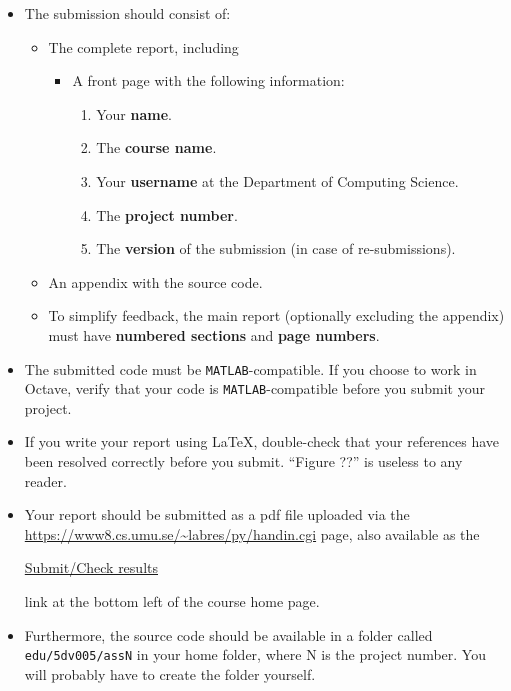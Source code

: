 \documentclass[a4paper,12pt]{article}
\begin{document}
{%
  \begin{itemize}
  \item The submission should consist of:
    \begin{itemize}
    \item The complete report, including
      \begin{itemize}
      \item A front page with the following information:
        \begin{enumerate}
        \item Your {\bf name}.
        \item The {\bf course name}.
        \item Your {\bf username} at the Department of Computing
          Science.
        \item The {\bf project number}.
        \item The {\bf version} of the submission (in case of re-submissions).
        \end{enumerate}
      \end{itemize}
    \item An appendix with the source code.
    \item To simplify feedback, the main report (optionally excluding
      the appendix) must have {\bf numbered sections} and {\bf page
        numbers}.
    \end{itemize}
  \item The submitted code must be {\tt MATLAB}-compatible. If you choose to
    work in Octave, verify that your code is {\tt MATLAB}-compatible before
    you submit your project.
  \item If you write your report using \LaTeX, double-check that your
    references have been resolved correctly before you submit. ``Figure ??'' is useless to any reader.
  \item Your report should be submitted as a pdf file uploaded via
    the\linebreak
    \href{https://www8.cs.umu.se/~labres/py/handin.cgi}{https://www8.cs.umu.se/\textasciitilde{}labres/py/handin.cgi}
    page, also available as the
    \begin{center}
      \href{https://www8.cs.umu.se/~labres/py/handin.cgi}{Submit/Check results}
    \end{center} link at the bottom left of the course home page.
  \item Furthermore, the source code should be available in a folder
    called {\tt edu/5dv005/assN} in your home folder, where N is the
    project number. You will probably have to create the folder
    yourself.
  \end{itemize}
}
\vfill
\end{document}
